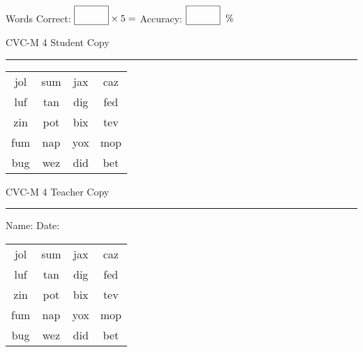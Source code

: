 \documentclass{memoir}
\begin{document}
\small

Words Correct: $\fbox{\phantom{\huge 100}} \times 5 = $ Accuracy: $\fbox{\phantom{\huge 100}}\;\; \%$ 

\vfill

\newpage


\footnotesize \noindent
CVC-M 4 \hfill Student Copy
\smallskip
\hrule

\Large

\setlength{\tabcolsep}{14pt}
\def\arraystretch{2}

{\selectfont


\begin{vplace}[0.5]
\begin{center}
\begin{tabular}{cccc}
jol & sum & jax & caz \\
luf & tan & dig & fed \\
zin & pot & bix & tev \\
fum & nap & yox & mop \\
bug & wez & did & bet \\
\end{tabular}
\end{center}
\end{vplace}

}

\newpage

\footnotesize \noindent
CVC-M 4 \hfill Teacher Copy
\smallskip
\hrule

\small

\vfill

\noindent
Name: \underline{\hspace{1.75in}} \hfill Date: \underline{\hspace{1in}}

\Large

{\selectfont


\begin{vplace}[0.5]
\begin{center}
\begin{tabular}{cccc}
jol & sum & jax & caz \\
luf & tan & dig & fed \\
zin & pot & bix & tev \\
fum & nap & yox & mop \\
bug & wez & did & bet \\
\end{tabular}
\end{center}
\end{vplace}



}
\end{document}
